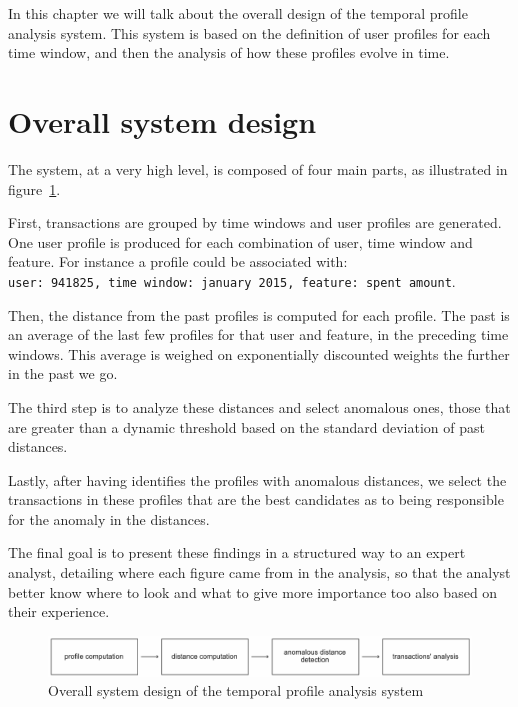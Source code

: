 
In this chapter we will talk about the overall design of the temporal profile analysis system. This system is based on the definition of user profiles for each time window, and then the analysis of how these profiles evolve in time.

\section{Overall system design}

The system, at a very high level, is composed of four main parts, as illustrated in figure~\ref{fig:system_design}.

First, transactions are grouped by time windows and user profiles are generated. One user profile is produced for each combination of user, time window and feature. For instance a profile could be associated with:\\ \texttt{user: 941825, time window: january 2015, feature: spent amount}.

Then, the distance from the past profiles is computed for each profile. The past is an average of the last few profiles for that user and feature, in the preceding time windows. This average is weighed on exponentially discounted weights the further in the past we go.

The third step is to analyze these distances and select anomalous ones, those that are greater than a dynamic threshold based on the standard deviation of past distances.

Lastly, after having identifies the profiles with anomalous distances, we select the transactions in these profiles that are the best candidates as to being responsible for the anomaly in the distances.

The final goal is to present these findings in a structured way to an expert analyst, detailing where each figure came from in the analysis, so that the analyst better know where to look and what to give more importance too also based on their experience.

\begin{figure}[h]
\centering
\includegraphics[width=450]{images/overall_system_design.pdf}
\caption{Overall system design of the temporal profile analysis system}
\label{fig:system_design}
\end{figure}

